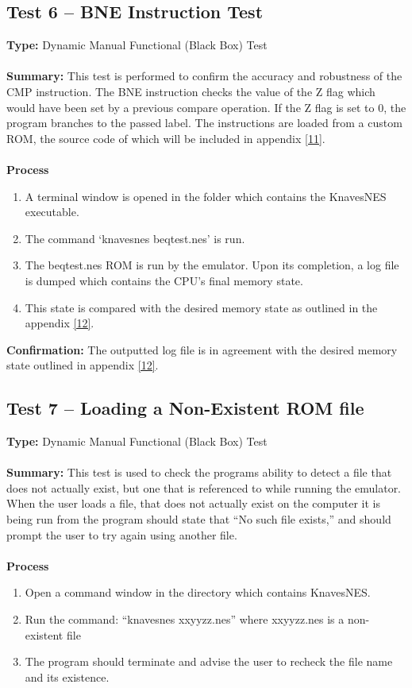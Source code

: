 \documentclass[12pt]{article}
\begin{document}
	\subsection{Test 6 – BNE Instruction Test}
		\textbf{Type: } Dynamic Manual Functional (Black Box) Test\\\\
		\textbf{Summary: } This test is performed to confirm the accuracy and robustness of the CMP instruction. The BNE instruction checks the value of the Z flag which would have been set by a previous compare operation. If the Z flag is set to 0, the program branches to the passed label. The instructions are loaded from a custom ROM, the source code of which will be included in appendix \hyperlink{appendix}{[11]}.\\\\
		\textbf{Process} 
			\begin{enumerate}
				\item A terminal window is opened in the folder which contains the KnavesNES executable.
				\item The command ‘knavesnes beqtest.nes’ is run.
				\item The beqtest.nes ROM is run by the emulator. Upon its completion, a log file is dumped which contains the CPU’s final memory state.
				\item This state is compared with the desired memory state as outlined in the appendix \hyperlink{appendix}{[12]}.
			\end{enumerate}
		\textbf{Confirmation: } The outputted log file is in agreement with the desired memory state outlined in appendix \hyperlink{appendix}{[12]}.
	\subsection{Test 7 – Loading a Non-Existent ROM file}
		\textbf{Type: } Dynamic Manual Functional (Black Box) Test\\\\
		\textbf{Summary: } This test is used to check the programs ability to detect a file that does not actually exist, but one that is referenced to while running the emulator. When the user loads a file, that does not actually exist on the computer it is being run from the program should state that “No such file exists,” and should prompt the user to try again using another file.\\\\
		\textbf{Process}
			\begin{enumerate}
				\item Open a command window in the directory which contains KnavesNES.
				\item Run the command: “knavesnes xxyyzz.nes” where xxyyzz.nes is a non-existent file
				\item The program should terminate and advise the user to recheck the file name and its existence. 
			\end{enumerate}
\end{document}
